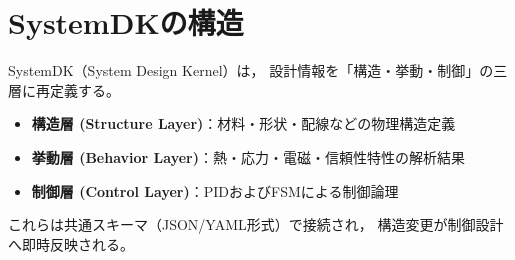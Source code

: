 \section{SystemDKの構造}
SystemDK（System Design Kernel）は，
設計情報を「構造・挙動・制御」の三層に再定義する。
\begin{itemize}
  \item \textbf{構造層 (Structure Layer)}：材料・形状・配線などの物理構造定義
  \item \textbf{挙動層 (Behavior Layer)}：熱・応力・電磁・信頼性特性の解析結果
  \item \textbf{制御層 (Control Layer)}：PIDおよびFSMによる制御論理
\end{itemize}
これらは共通スキーマ（JSON/YAML形式）で接続され，
構造変更が制御設計へ即時反映される。
